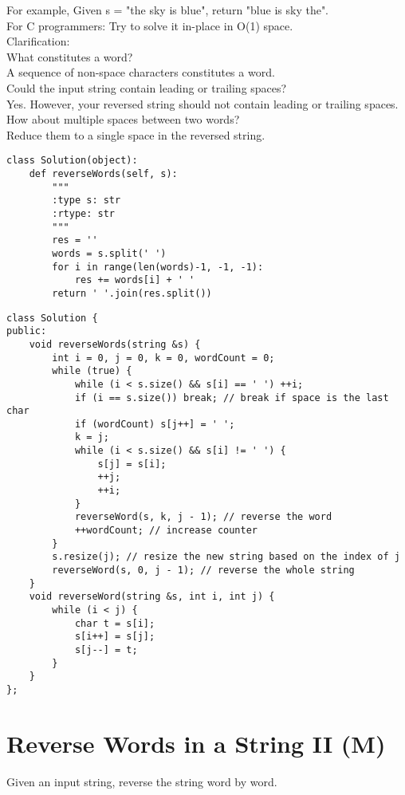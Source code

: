 For example,
Given s = "the sky is blue",
return "blue is sky the". \\

For C programmers: Try to solve it in-place in O(1) space.\\

Clarification:\\
    What constitutes a word?\\
    A sequence of non-space characters constitutes a word.\\
    Could the input string contain leading or trailing spaces?\\
    Yes. However, your reversed string should not contain leading or trailing spaces.\\
    How about multiple spaces between two words?\\
    Reduce them to a single space in the reversed string.\\

\begin{lstlisting}
class Solution(object):
    def reverseWords(self, s):
        """
        :type s: str
        :rtype: str
        """
        res = ''
        words = s.split(' ')
        for i in range(len(words)-1, -1, -1):
            res += words[i] + ' '
        return ' '.join(res.split())
\end{lstlisting}

\begin{lstlisting}
class Solution {
public:
    void reverseWords(string &s) {
        int i = 0, j = 0, k = 0, wordCount = 0;
        while (true) {
            while (i < s.size() && s[i] == ' ') ++i;
            if (i == s.size()) break; // break if space is the last char
            if (wordCount) s[j++] = ' ';
            k = j;
            while (i < s.size() && s[i] != ' ') {
                s[j] = s[i];
                ++j; 
                ++i;
            }
            reverseWord(s, k, j - 1); // reverse the word
            ++wordCount; // increase counter
        }
        s.resize(j); // resize the new string based on the index of j
        reverseWord(s, 0, j - 1); // reverse the whole string
    }
    void reverseWord(string &s, int i, int j) {
        while (i < j) {
            char t = s[i];
            s[i++] = s[j];
            s[j--] = t;
        }
    }
};
\end{lstlisting}


\section{Reverse Words in a String II (M)}
Given an input string, reverse the string word by word. \\

